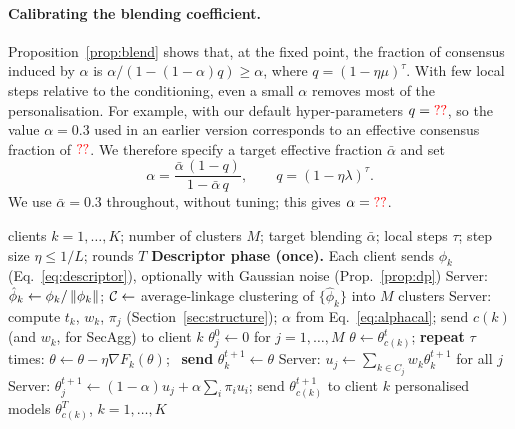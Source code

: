 \paragraph{Calibrating the blending coefficient.}
Proposition~\ref{prop:blend} shows that, at the fixed point, the fraction of consensus
induced by $\alpha$ is $\alpha/(1-(1-\alpha)q)\ge\alpha$, where $q=(1-\eta\mu)^{\tau}$. With
few local steps relative to the conditioning, even a small $\alpha$ removes most of the
personalisation. For example, with our default hyper-parameters $q=\textcolor{red}{??}$, so the value
$\alpha=0.3$ used in an earlier version corresponds to an effective consensus fraction of
$\textcolor{red}{??}$. We therefore specify a target effective fraction $\bar\alpha$ and set
\begin{equation}
  \alpha=\frac{\bar\alpha\,(1-q)}{1-\bar\alpha\,q},\qquad q=(1-\eta\lambda)^{\tau}.
  \label{eq:alphacal}
\end{equation}
We use $\bar\alpha=0.3$ throughout, without tuning; this gives $\alpha=\textcolor{red}{??}$.

\begin{algorithm}[t]
\caption{\ptopofl}
\label{alg:ptopofl}
\begin{algorithmic}[1]
\Require clients $k=1,\dots,K$; number of clusters $M$; target blending $\bar\alpha$;
         local steps $\tau$; step size $\eta\le 1/L$; rounds $T$
\State \textbf{Descriptor phase (once).} Each client sends $\phi_k$ (Eq.~\ref{eq:descriptor}), optionally with Gaussian noise (Prop.~\ref{prop:dp})
\State Server: $\hat\phi_k\gets\phi_k/\left\lVert \phi_k \right\rVert$; $\mathcal{C}\gets$ average-linkage clustering of $\{\hat\phi_k\}$ into $M$ clusters
\State Server: compute $t_k$, $w_k$, $\pi_j$ (Section~\ref{sec:structure}); $\alpha$ from Eq.~\eqref{eq:alphacal}; send $c(k)$ (and $w_k$, for SecAgg) to client $k$
\State $\theta_j^0\gets 0$ for $j=1,\dots,M$
     \State $\theta\gets\theta^t_{c(k)}$; \textbf{repeat} $\tau$ times: $\theta\gets\theta-\eta\nabla F_k(\theta)$; \ \textbf{send} $\theta_k^{t+1}\gets\theta$
  \EndFor
  \State Server: $u_j\gets\sum_{k\in C_j}w_k\theta_k^{t+1}$ for all $j$ 
  \State Server: $\theta_j^{t+1}\gets(1-\alpha)u_j+\alpha\sum_i\pi_iu_i$; send $\theta^{t+1}_{c(k)}$ to client $k$
\EndFor
\State \Return personalised models $\theta^T_{c(k)}$, $k=1,\dots,K$
\end{algorithmic}
\end{algorithm}

